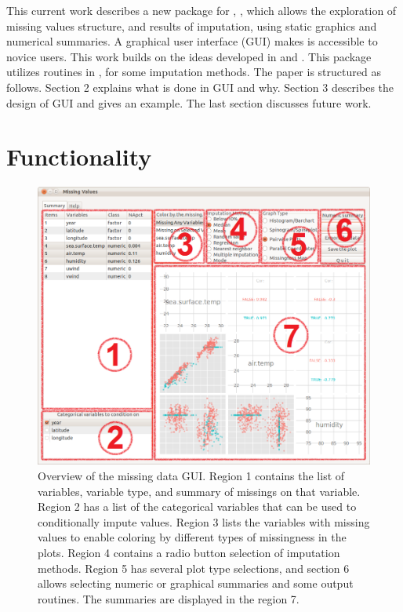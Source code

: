 \documentclass[article]{jss}
\begin{document}
This current work describes a new package for , , which allows the exploration of missing values structure, and results of imputation, using static graphics and numerical summaries. A graphical user interface (GUI) makes is accessible to novice users. This work builds on the ideas developed in \citet{unwin1996interactive} and \citet{swayne1998missing}. This package utilizes routines in  \citep{hmisc},  \citep{norm} for some imputation methods. The paper is structured as follows. Section 2 explains what is done in GUI and why. Section 3 describes the design of GUI and gives an example. The last section discusses future work.

\section{Functionality}

\begin{center}
%
\begin{figure}[h]
\begin{centering}
\includegraphics[width=.9\textwidth]{fig1-1-0}
\par\end{centering}

\caption{Overview of the missing data GUI. Region 1 contains the list of variables, variable type, and summary of missings on that variable. Region 2 has a list of the categorical variables that can be used to conditionally impute values. Region 3 lists the variables with missing values to enable coloring by different types of missingness in the plots. Region 4 contains a radio button selection of imputation methods. Region 5 has several plot type selections, and section 6 allows selecting numeric or graphical summaries and some output routines. The summaries are displayed in the region 7.}
\label{fig: missingGUI}
\end{figure}

\par\end{center}
\end{document}
